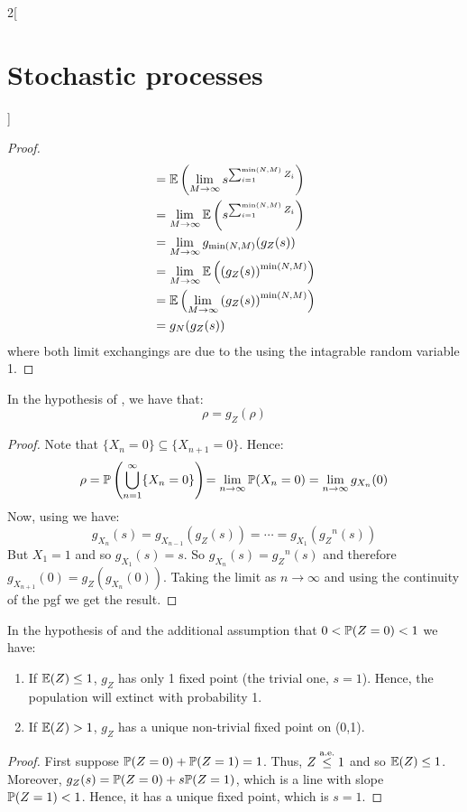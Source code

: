 \documentclass[../../../main_math.tex]{subfiles}
\begin{document}
\begin{multicols}{2}[\section{Stochastic processes}]
\begin{proof}
\begin{align*}
             & =\mathbb{E}\left(\lim_{M\to\infty}s^{\sum_{i=1}^{\min(N,M)}Z_i}\right) \\
             & =\lim_{M\to\infty}\mathbb{E}\left(s^{\sum_{i=1}^{\min(N,M)}Z_i}\right) \\
             & =\lim_{M\to\infty}g_{\min(N,M)}(g_Z(s))                          \\
             & =\lim_{M\to\infty}\mathbb{E}\left({(g_Z(s))}^{\min(N,M)}\right)        \\
             & =\mathbb{E}\left(\lim_{M\to\infty}{(g_Z(s))}^{\min(N,M)}\right)        \\
             & =g_N(g_Z(s))
    \end{align*}
    where both limit exchangings are due to the  using the intagrable random variable 1.
  \end{proof}
  \begin{theorem}
    In the hypothesis of , we have that: $$\rho=g_Z(\rho)$$
  \end{theorem}
  \begin{proof}
    Note that $\{X_n=0\}\subseteq \{X_{n+1}=0\}$. Hence:
    $$\rho=\mathbb{P}\left(\bigcup_{n=1}^\infty\{X_n=0\}\right)\!=\lim_{n\to\infty}\mathbb{P}(X_n=0)=\lim_{n\to\infty}g_{X_n}(0)$$
    Now, using  we have:
    $$g_{X_{n}}(s)=g_{X_{n-1}}(g_Z(s))=\cdots=g_{X_1}({g_Z}^n(s))$$
    But $X_1=1$ and so $g_{X_1}(s)=s$. So $g_{X_{n}}(s)={g_Z}^n(s)$ and therefore
    $g_{X_{n+1}}(0)=g_Z(g_{X_{n}}(0))$.
    Taking the limit as $n\to\infty$ and using the continuity of the pgf we get the result.
  \end{proof}
  \begin{theorem}
    In the hypothesis of  and the additional assumption that $0<\mathbb{P}(Z=0)<1$ we have:
    \begin{enumerate}
      \item If $\mathbb{E}(Z)\leq 1$, $g_Z$ has only 1 fixed point (the trivial one, $s=1$). Hence, the population will extinct with probability 1.
      \item If $\mathbb{E}(Z)> 1$, $g_Z$ has a unique non-trivial fixed point on (0,1).
    \end{enumerate}
  \end{theorem}
  \begin{proof}
    First suppose $\mathbb{P}(Z=0)+\mathbb{P}(Z=1)=1$. Thus, $Z\overset{\text{a.e.}}{\leq}1$ and so $\mathbb{E}(Z)\leq 1$. Moreover, $g_Z(s)=\mathbb{P}(Z=0)+s\mathbb{P}(Z=1)$, which is a line with slope $\mathbb{P}(Z=1)<1$. Hence, it has a unique fixed point, which is $s=1$.


\end{proof}
\end{multicols}
\end{document}
